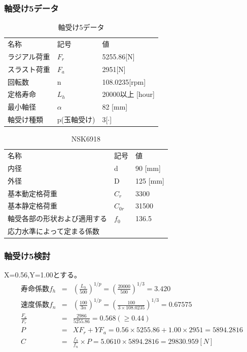 \documentclass[a4j,twoside,openright,11pt]{jreport}
\begin{document}
\subsubsection{軸受け5データ}
\begin{table}[htb]
\begin{center}
  \caption{軸受け5データ}
  \begin{tabular}{lll} \hline
名称&記号&値\\
ラジアル荷重&$F_r$&5255.86[N]\\
スラスト荷重&$F_a$&2951[N]\\
回転数&n&108.0235[rpm]\\
定格寿命&$L_h$&20000以上 [hour]\\
最小軸径&$\alpha$&82 [mm]\\
軸受け種類&p(玉軸受け)&3[$\cdot$]\\
\hline
  \end{tabular}
\end{center}
\end{table}

\begin{table}[htb]
\begin{center}
  \caption{NSK6918}
  \begin{tabular}{lll} \hline
名称&記号&値\\
内径& d & 90 [mm]\\
外径& D & 125 [mm]\\
基本動定格荷重&$C_{r}$&3300\\
基本静定格荷重&$C_{0r}$&31500\\
軸受各部の形状および適用する&$f_0$&136.5\\
応力水準によって定まる係数&&\\
\hline
  \end{tabular}
\end{center}
\end{table}

\subsubsection{軸受け5検討}
X=0.56,Y=1.00とする。
\begin{eqnarray}
寿命係数f_h &=& \left( \frac{L_h}{500} \right)^{1/p} = \left( \frac{20000}{500} \right)^{1/3} = 3.420\\
速度係数f_n &=& \left( \frac{100}{3n} \right)^{1/p} = \left( \frac{100}{3 \times 108.0235} \right)^{1/3} = 0.67575\\
\frac{F_a}{F_r} &=& \frac{2986}{5255.86} = 0.568(\geq 0.44)\\
P &=& XF_r+YF_a = 0.56 \times 5255.86 + 1.00 \times 2951 = 5894.2816\\
C &=& \frac{f_h}{f_n} \times P = 5.0610 \times 5894.2816 = 29830.959[N]
\end{eqnarray}
\end{document}

